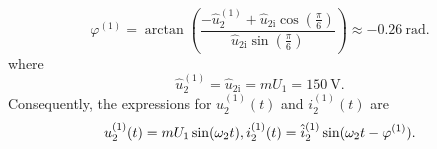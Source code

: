 \begin{solutionblock}
\begin{equation}
        \varphi^\mathrm{(1)} = \arctan(\frac{-\hat{u}^\mathrm{(1)}_\mathrm{2} + \hat{u}_{2\mathrm{i}} \cos(\frac{\pi}{6})}{\hat{u}_{2\mathrm{i}} \sin(\frac{\pi}{6})}) \approx \SI{-0.26}{\radian}.
        \label{7.1.2:eq:phase_i_2_fund}         
    \end{equation}
    where 
    \begin{equation}
        \hat{u}^\mathrm{(1)}_\mathrm{2} =  \hat{u}_{2\mathrm{i}} = m U_1 = \SI{150}{\volt}. 
        \label{7.1.2:eq:i_u_2_fund}          
    \end{equation}
    Consequently, the expressions for $u^\mathrm{(1)}_\mathrm{2}(t)$ and $i^\mathrm{(1)}_\mathrm{2}(t)$ are
    \begin{equation}
        u^\mathrm{(1)}_\mathrm{2}(t) = m U_{\mathrm{1}} \sin(\omega_2 t),\\
        i^\mathrm{(1)}_\mathrm{2}(t) = \hat{i}^\mathrm{(1)}_\mathrm{2} \sin(\omega_2 t - \varphi^\mathrm{(1)}).
        \label{7.1.2:eq:i_u_2_fund}          
    \end{equation}
\end{solutionblock}

